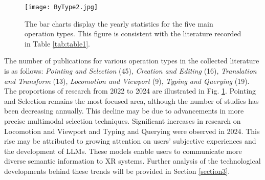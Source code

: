 \documentclass[review]{fcs}
\begin{document}
\begin{figure}
    \begin{center}
    \texttt{[image: ByType2.jpg]}
    \end{center}
    \caption{
The bar charts display the yearly statistics for the five main operation types. This figure is consistent with the literature recorded in Table \ref{tab:table1}.
    }
    \label{fig:bytype}
    \vspace{-6mm}
\end{figure}


The number of publications for various operation types in the collected literature is as follows: \textit{Pointing and Selection} (45), \textit{Creation and Editing} (16), \textit{Translation and Transform} (13), \textit{Locomotion and Viewport} (9), \textit{Typing and Querying} (19). The proportions of research from 2022 to 2024 are illustrated in Fig. \ref{fig:bytype}. Pointing and Selection remains the most focused area, although the number of studies has been decreasing annually. This decline may be due to advancements in more precise multimodal selection techniques.
Significant increases in research on Locomotion and Viewport and Typing and Querying were observed in 2024. This rise may be attributed to growing attention on users' subjective experiences and the development of LLMs. These models enable users to communicate more diverse semantic information to XR systems. Further analysis of the technological developments behind these trends will be provided in Section \ref{section3}.
\end{document}
